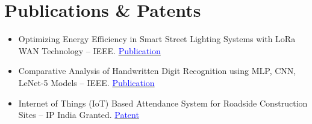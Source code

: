 \documentclass[a4paper,11pt]{article}
\newcommand{\resumeItemListStart}{\begin{itemize}[leftmargin=1.5em, rightmargin=0.2em, itemsep=-1pt, parsep=0pt, topsep=2pt]}
\newcommand{\resumeItemListEnd}{\end{itemize}\vspace{-4pt}}
\newcommand{\resumeItem}[1]{\item\small{#1}}
\begin{document}
\section{Publications \& Patents}
\resumeItemListStart
  \resumeItem{Optimizing Energy Efficiency in Smart Street Lighting Systems with LoRa WAN Technology -- IEEE. \hfill \href{https://ieeexplore.ieee.org/document/10527564}{\textcolor{blue}{Publication}}}
  \resumeItem{Comparative Analysis of Handwritten Digit Recognition using MLP, CNN, LeNet-5 Models -- IEEE. \hfill \href{https://ieeexplore.ieee.org/document/10939547}{\textcolor{blue}{Publication}}}
  \resumeItem{Internet of Things (IoT) Based Attendance System for Roadside Construction Sites -- IP India Granted. \hfill \href{https://drive.google.com/file/d/1zTYg7hnRU_YZuY8qC2AFABGL-V3i2Cie/view?usp=sharing}{\textcolor{blue}{Patent}}}
\resumeItemListEnd
\end{document}
